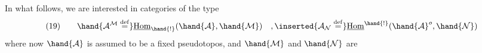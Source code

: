 In what follows, we are interested in  categories
of the type
\[ (19) \qquad \hand{\mathcal{A}^{\mathcal{M}} \overset{\mathrm{def}}{=}} \underline{\mathrm{Hom}}_{\hand{!}}(\hand{\mathcal{A}}, \hand{\mathcal{M}}) \quad , \inserted{\mathcal{A}_{\mathcal{N}} \overset{\mathrm{def}}{=}} \underline{\mathrm{Hom}}^{\hand{!}}(\hand{\mathcal{A}}^{o}, \hand{\mathcal{N}}) \]
where now $\hand{\mathcal{A}}$ is assumed to be a fixed pseudotopos, and $\hand{\mathcal{M}}$ and $\hand{\mathcal{N}}$ are

